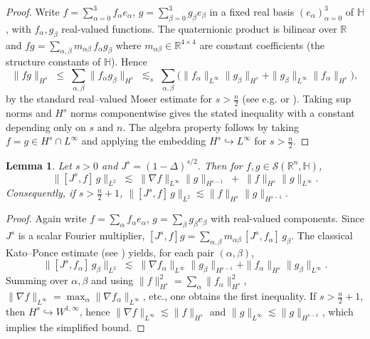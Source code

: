 \documentclass[10pt]{amsart}
\numberwithin{equation}{section}
\newtheorem{lem}[theorem]{Lemma}
\theoremstyle{remark}
\theoremstyle{definition}
\begin{document}
\begin{proof}
Write $f=\sum_{\alpha=0}^{3} f_\alpha e_\alpha$, $g=\sum_{\beta=0}^{3} g_\beta e_\beta$ in a fixed real basis $(e_\alpha)_{\alpha=0}^3$ of $\mathbb{H}$,
with $f_\alpha,g_\beta$ real-valued functions. The quaternionic product is bilinear over $\mathbb R$ and
$fg=\sum_{\alpha,\beta} m_{\alpha\beta}\, f_\alpha g_\beta$ where $m_{\alpha\beta}\in\mathbb R^{4\times 4}$ are constant coefficients
(the structure constants of $\mathbb H$). Hence
\[
\|fg\|_{H^{s}}
\;\le\; \sum_{\alpha,\beta} \| f_\alpha g_\beta\|_{H^{s}}
\;\lesssim_s\; \sum_{\alpha,\beta}
\big(\|f_\alpha\|_{L^\infty}\|g_\beta\|_{H^{s}}+\|g_\beta\|_{L^\infty}\|f_\alpha\|_{H^{s}}\big),
\]
by the standard real--valued Moser estimate for $s>\frac{n}{2}$ (see e.g. \cite[Thm.~4.39]{Adams2003} or \cite{Moser1966}).
Taking sup norms and $H^{s}$ norms componentwise gives the stated inequality with a constant depending only on $s$ and $n$.
The algebra property follows by taking $f=g\in H^{s}\cap L^\infty$ and applying the embedding $H^s\hookrightarrow L^\infty$ for $s>\frac{n}{2}$.
\end{proof}

\begin{lem}\label{lem:KatoPonce}
Let $s>0$ and $J^{s}=(1-\Delta)^{s/2}$. Then for $f,g\in \mathcal{S}(\mathbb{R}^n,\mathbb{H})$,
\[
\|[J^{s},f]\,g\|_{L^{2}}
\;\lesssim\;
\|\nabla f\|_{L^{\infty}}\|g\|_{H^{s-1}}
\;+\;
\|f\|_{H^{s}}\|g\|_{L^{\infty}}.
\]
Consequently, if $s>\frac{n}{2}+1$,
\(
\|[J^{s},f]\,g\|_{L^{2}}
\lesssim
\|f\|_{H^{s}}\|g\|_{H^{s-1}}.
\)
\end{lem}

\begin{proof}
Again write $f=\sum_\alpha f_\alpha e_\alpha$, $g=\sum_\beta g_\beta e_\beta$ with real-valued components.
Since $J^s$ is a scalar Fourier multiplier, $[J^s,f]g = \sum_{\alpha,\beta} m_{\alpha\beta}\,[J^s,f_\alpha]\,g_\beta$.
The classical Kato--Ponce estimate (see \cite{Kato1988}) yields, for each pair $(\alpha,\beta)$,
\[
\|[J^{s},f_\alpha]\,g_\beta\|_{L^{2}}
\;\lesssim\;
\|\nabla f_\alpha\|_{L^{\infty}}\|g_\beta\|_{H^{s-1}}
+\|f_\alpha\|_{H^{s}}\|g_\beta\|_{L^{\infty}}.
\]
Summing over $\alpha,\beta$ and using $\|f\|_{H^s}^2=\sum_\alpha\|f_\alpha\|_{H^s}^2$, $\|\nabla f\|_{L^\infty}=\max_\alpha\|\nabla f_\alpha\|_{L^\infty}$, etc.,
one obtains the first inequality. If $s>\frac{n}{2}+1$, then $H^s\hookrightarrow W^{1,\infty}$, hence $\|\nabla f\|_{L^\infty}\lesssim \|f\|_{H^s}$
and $\|g\|_{L^\infty}\lesssim\|g\|_{H^{s-1}}$, which implies the simplified bound.
\end{proof}
\end{document}
